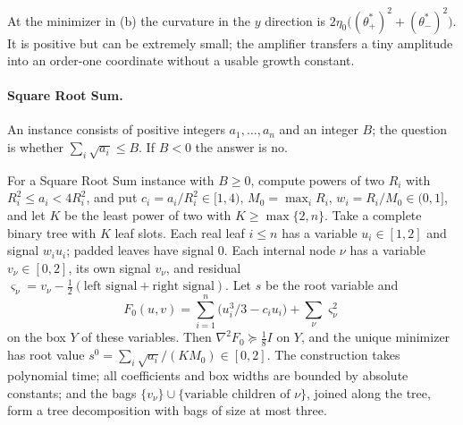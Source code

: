 At the minimizer in (b) the curvature in the $y$ direction is
$2\eta_0\bigl((\theta_+^*)^2+(\theta_-^*)^2\bigr)$. It is positive but can be
extremely small; the amplifier transfers a tiny amplitude into an order-one
coordinate without a usable growth constant.

\paragraph{Square Root Sum.}
An instance consists of positive integers $a_1,\ldots,a_n$ and an integer
$B$; the question is whether $\sum_i\sqrt{a_i}\le B$. If $B<0$ the answer is
no.

\begin{lemma}\label{lem:points-tree}
For a Square Root Sum instance with $B\ge0$, compute powers of two $R_i$
with $R_i^2\le a_i<4R_i^2$, and put $c_i=a_i/R_i^2\in[1,4)$,
$M_0=\max_iR_i$, $w_i=R_i/M_0\in(0,1]$, and let $K$ be the least power of
two with $K\ge\max\{2,n\}$. Take a complete binary tree with $K$ leaf
slots. Each real leaf $i\le n$ has a variable $u_i\in[1,2]$ and signal
$w_iu_i$; padded leaves have signal $0$. Each internal node $\nu$ has a
variable $v_\nu\in[0,2]$, its own signal $v_\nu$, and residual
$\varsigma_\nu=v_\nu-\frac12(\text{left signal}+\text{right signal})$. Let
$s$ be the root variable and
\[
 F_0(u,v)=\sum_{i=1}^n\bigl(u_i^3/3-c_iu_i\bigr)+\sum_\nu\varsigma_\nu^2
\]
on the box $Y$ of these variables. Then $\nabla^2F_0\succeq\frac18I$ on $Y$,
and the unique minimizer has root value $s^0=\sum_i\sqrt{a_i}/(KM_0)\in[0,2]$.
The construction takes polynomial time; all coefficients and box widths are
bounded by absolute constants; and the bags
$\{v_\nu\}\cup\{\text{variable children of }\nu\}$, joined along the tree,
form a tree decomposition with bags of size at most three.
\end{lemma}

